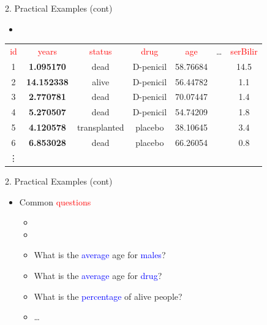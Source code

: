 \documentclass[14pt, aspectratio=169, sectionpage=simple, xclolor=table]{beamer}
\begin{document}
\begin{frame}[fragile]{2. Practical Examples (cont)}
\begin{itemize}
\item {}
\end{itemize}
{\small{}
	\begin{tabular}{ccccccc}
\textcolor{red}{id} &  \textcolor{red}{years} &  \textcolor{red}{status}  &  \textcolor{red}{drug} &  \textcolor{red}{age} & \dots &  \textcolor{red}{serBilir}\\
1& \textbf{1.095170}& dead&   D-penicil & 58.76684 & & 14.5\\
2& \textbf{14.152338}& alive&   D-penicil & 56.44782 & & 1.1\\
3& \textbf{2.770781}& dead& D-penicil & 70.07447 & & 1.4\\
4& \textbf{5.270507}& dead& D-penicil & 54.74209 & & 1.8\\
5& \textbf{4.120578}& transplanted&   placebo & 38.10645 & & 3.4\\                                                   
6& \textbf{6.853028}& dead&   placebo & 66.26054 & & 0.8\\
\vdots &&&&&&
\end{tabular}
}
\end{frame}
\begin{frame}{2. Practical Examples (cont)}
\begin{itemize}
\item Common \textcolor{red}{questions}
\vspace{1ex}
\begin{itemize}
\item {}
\item {}
\item What is the \textcolor{blue}{average} age for \textcolor{blue}{males}?
\item What is the \textcolor{blue}{average} age for \textcolor{blue}{drug}?
\item What is the \textcolor{blue}{percentage} of alive people?
\item \dots
\end{itemize}
\end{itemize}
\end{frame}
\end{document}
